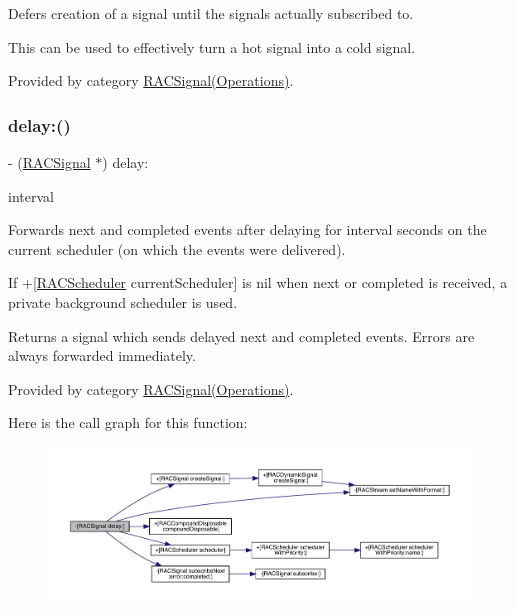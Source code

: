 Defers creation of a signal until the signal\textquotesingle{}s actually subscribed to.

This can be used to effectively turn a hot signal into a cold signal. 

Provided by category \mbox{\hyperlink{category_r_a_c_signal_07_operations_08_a3f29638c9c7f60928b7a6cbf2fe25d6f}{R\+A\+C\+Signal(\+Operations)}}.

\mbox{\label{interface_r_a_c_signal_adc28e5c64d2e6ec8c5ab8465fa6c89b4}} 
\subsubsection{\texorpdfstring{delay\+:()}{delay:()}\hspace{0.1cm}{\footnotesize\ttfamily [1/3]}}
{\footnotesize\ttfamily -\/ (\mbox{\hyperlink{interface_r_a_c_signal}{R\+A\+C\+Signal}} $\ast$) delay\+: \begin{DoxyParamCaption}\item[{(N\+S\+Time\+Interval)}]{interval }\end{DoxyParamCaption}}

Forwards {\ttfamily next} and {\ttfamily completed} events after delaying for {\ttfamily interval} seconds on the current scheduler (on which the events were delivered).

If +\mbox{[}\mbox{\hyperlink{interface_r_a_c_scheduler}{R\+A\+C\+Scheduler}} current\+Scheduler\mbox{]} is nil when {\ttfamily next} or {\ttfamily completed} is received, a private background scheduler is used.

Returns a signal which sends delayed {\ttfamily next} and {\ttfamily completed} events. Errors are always forwarded immediately. 

Provided by category \mbox{\hyperlink{category_r_a_c_signal_07_operations_08_adc28e5c64d2e6ec8c5ab8465fa6c89b4}{R\+A\+C\+Signal(\+Operations)}}.

Here is the call graph for this function\+:\nopagebreak
\begin{figure}[H]
\begin{center}
\leavevmode
\includegraphics[width=350pt]{interface_r_a_c_signal_adc28e5c64d2e6ec8c5ab8465fa6c89b4_cgraph}
\end{center}
\end{figure}
\mbox{\label{interface_r_a_c_signal_adc28e5c64d2e6ec8c5ab8465fa6c89b4}} 
